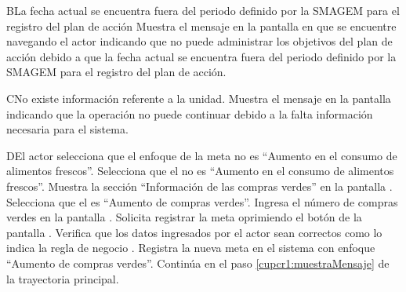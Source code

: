    \begin{UCtrayectoriaA}{B}{La fecha actual se encuentra fuera del periodo definido por la SMAGEM para el registro del plan de acción}
    \UCpaso[\UCsist] Muestra el mensaje  en la pantalla en que se encuentre navegando el actor indicando que no puede administrar los objetivos del plan de acción debido a que la fecha actual se encuentra fuera del periodo definido por la SMAGEM para el registro del plan de acción.
 \end{UCtrayectoriaA}

 
 
 
 
\begin{UCtrayectoriaA}{C}{No existe información referente a la unidad.}
	\UCpaso[\UCsist] Muestra el mensaje  en la pantalla  indicando que la operación no puede continuar debido a la falta información necesaria para el sistema.
\end{UCtrayectoriaA}

\begin{UCtrayectoriaA}{D}{El actor selecciona que el enfoque de la meta no es ``Aumento en el consumo de alimentos frescos''.}
	\UCpaso[\UCactor] Selecciona que el  no es ``Aumento en el consumo de alimentos frescos''. 
	\UCpaso[\UCsist] Muestra la sección ``Información de las compras verdes'' en la pantalla .
	\UCpaso[\UCactor] Selecciona que el  es ``Aumento de compras verdes''. 
	\UCpaso[\UCactor] Ingresa el número de compras verdes en la pantalla .
	\UCpaso[\UCactor] Solicita registrar la meta oprimiendo el botón  de la pantalla .  
	\UCpaso[\UCsist] Verifica que los datos ingresados por el actor sean correctos como lo indica la regla de negocio .   
	\UCpaso[\UCsist] Registra la nueva meta en el sistema con enfoque ``Aumento de compras verdes''.
	\UCpaso[] Continúa en el paso \ref{cupcr1:muestraMensaje} de la trayectoria principal.
\end{UCtrayectoriaA}

